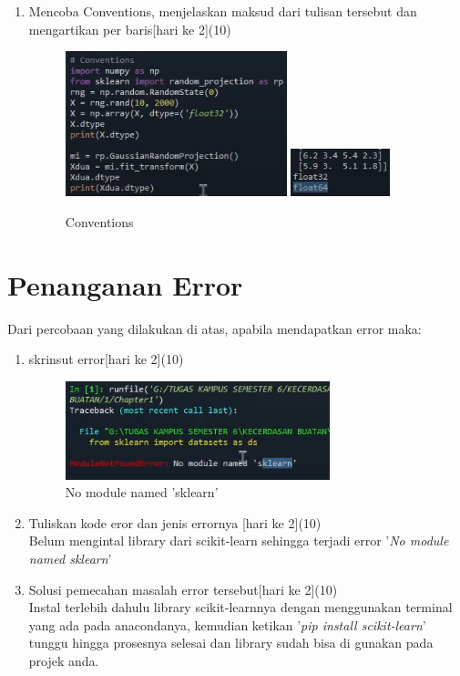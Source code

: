\begin{enumerate}
    \item
          Mencoba Conventions, menjelaskan maksud dari tulisan tersebut dan mengartikan per baris[hari ke 2](10)

          \begin{figure}[ht]
              \centerline{\includegraphics[scale=0.8]{figures/Chapter1f.png}
                  \includegraphics[scale=0.8]{figures/Chapter1fa.png}}
              \caption{Conventions}
              \label{Conventions}
          \end{figure}
\end{enumerate}

\newpage
\section{Penanganan Error}
Dari percobaan yang dilakukan di atas, apabila mendapatkan error maka:

\begin{enumerate}
    \item
          skrinsut error[hari ke 2](10)

          \begin{figure}[ht]
              \centerline{\includegraphics[scale=1]{figures/Chapter1error.png}}
              \caption{No module named 'sklearn'}
              \label{ChapterError}
          \end{figure}

    \item
          Tuliskan kode eror dan jenis errornya [hari ke 2](10)
          \\ Belum mengintal library dari scikit-learn sehingga terjadi error '\textit{No module named sklearn}'

    \item
          Solusi pemecahan masalah error tersebut[hari ke 2](10)
          \\ Instal terlebih dahulu library scikit-learnnya dengan menggunakan terminal yang ada pada anacondanya, kemudian ketikan '\textit{pip install scikit-learn}' tunggu hingga prosesnya selesai dan library sudah bisa di gunakan pada projek anda.


\end{enumerate}